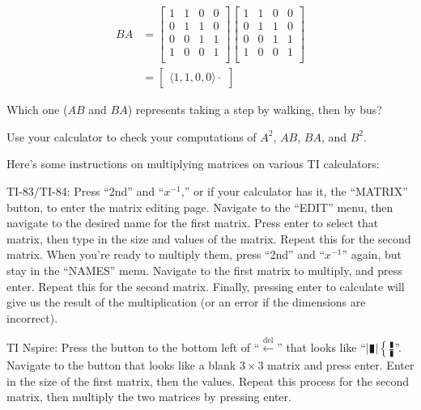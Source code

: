 \documentclass[../gatm_answers.tex]{subfiles}
\begin{document}
\begin{align*}
BA &= \begin{bmatrix}
1 & 1 & 0 & 0 \\
0 & 1 & 1 & 0 \\
0 & 0 & 1 & 1 \\
1 & 0 & 0 & 1 \\
\end{bmatrix}\begin{bmatrix}
1 & 1 & 0 & 0 \\
0 & 1 & 1 & 0 \\
0 & 0 & 1 & 1 \\
1 & 0 & 0 & 1 \\
\end{bmatrix} \\
&= \begin{bmatrix}
\langle1,1,0,0\rangle\cdot
\end{bmatrix}
\end{align*}

\begin{inner_problem}
\item Which one ($AB$ and $BA$) represents taking a step by walking, then by bus?
\end{inner_problem}

\begin{inner_problem}
\item Use your calculator to check your computations of $A^2$, $AB$, $BA$, and $B^2$.
\end{inner_problem}

Here's some instructions on multiplying matrices on various TI calculators:

TI-83/TI-84: Press ``2nd'' and ``$x^{-1}$,'' or if your calculator has it, the ``MATRIX'' button, to enter the matrix editing page. Navigate to the ``EDIT'' menu, then navigate to the desired name for the first matrix. Press enter to select that matrix, then type in the size and values of the matrix. Repeat this for the second matrix. When you're ready to multiply them, press ``2nd'' and ``$x^{-1}$'' again, but stay in the ``NAMES'' menu. Navigate to the first matrix to multiply, and press enter. Repeat this for the second matrix. Finally, pressing enter to calculate will give us the result of the multiplication (or an error if the dimensions are incorrect).

TI Nspire: Press the button to the bottom left of ``$\stackrel{\text{del}}{\leftarrow}$'' that looks like ``$|\vrectangleblack|\left\{\frac{\vrectangleblack}{\vrectangleblack}\right.$''. Navigate to the button that looks like a blank $3\times 3$ matrix and press enter. Enter in the size of the first matrix, then the values. Repeat this process for the second matrix, then multiply the two matrices by pressing enter.
\end{document}
